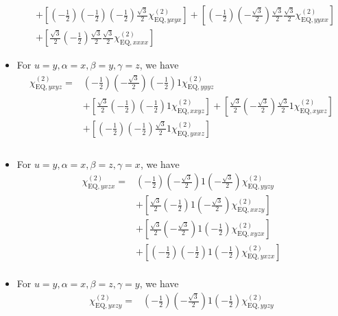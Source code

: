 \documentclass[UTF8,10pt,a4paper]{article}
\begin{document}
\begin{itemize}
\begin{align}
\nonumber&+\left[\left(-\frac{1}{2}\right)\left(-\frac{1}{2}\right)\left(-\frac{1}{2}\right)\frac{\sqrt{3}}{2}\chi_{\text{EQ},yxyx}^{(2)}\right]+\left[\left(-\frac{1}{2}\right)\left(-\frac{\sqrt{3}}{2}\right)\frac{\sqrt{3}}{2}\frac{\sqrt{3}}{2}\chi_{\text{EQ},yyxx}^{(2)}\right]\\
&+\left[\frac{\sqrt{3}}{2}\left(-\frac{1}{2}\right)\frac{\sqrt{3}}{2}\frac{\sqrt{3}}{2}\chi_{\text{EQ},xxxx}^{(2)}\right]
\end{align}\normalsize
\item For $u=y,\alpha=x,\beta=y,\gamma=z$, we have
\footnotesize\begin{align}
\nonumber\chi_{\text{EQ},yxyz}^{(2)}=&\left(-\frac{1}{2}\right)\left(-\frac{\sqrt{3}}{2}\right)\left(-\frac{1}{2}\right)1\chi_{\text{EQ},yyyz}^{(2)}\\
\nonumber&+\left[\frac{\sqrt{3}}{2}\left(-\frac{1}{2}\right)\left(-\frac{1}{2}\right)1\chi_{\text{EQ},xxyz}^{(2)}\right]+\left[\frac{\sqrt{3}}{2}\left(-\frac{\sqrt{3}}{2}\right)\frac{\sqrt{3}}{2}1\chi_{\text{EQ},xyxz}^{(2)}\right]\\
\nonumber&+\left[\left(-\frac{1}{2}\right)\left(-\frac{1}{2}\right)\frac{\sqrt{3}}{2}1\chi_{\text{EQ},yxxz}^{(2)}\right]\\
\nonumber&\\
&
\end{align}\normalsize
\item For $u=y,\alpha=x,\beta=z,\gamma=x$, we have
\footnotesize\begin{align}
\nonumber\chi_{\text{EQ},yxzx}^{(2)}=&\left(-\frac{1}{2}\right)\left(-\frac{\sqrt{3}}{2}\right)1\left(-\frac{\sqrt{3}}{2}\right)\chi_{\text{EQ},yyzy}^{(2)}\\
\nonumber&+\left[\frac{\sqrt{3}}{2}\left(-\frac{1}{2}\right)1\left(-\frac{\sqrt{3}}{2}\right)\chi_{\text{EQ},xxzy}^{(2)}\right]\\
\nonumber&+\left[\frac{\sqrt{3}}{2}\left(-\frac{\sqrt{3}}{2}\right)1\left(-\frac{1}{2}\right)\chi_{\text{EQ},xyzx}^{(2)}\right]\\
\nonumber&+\left[\left(-\frac{1}{2}\right)\left(-\frac{1}{2}\right)1\left(-\frac{1}{2}\right)\chi_{\text{EQ},yxzx}^{(2)}\right]\\
&
\end{align}\normalsize
\item For $u=y,\alpha=x,\beta=z,\gamma=y$, we have
\footnotesize\begin{align}
\nonumber\chi_{\text{EQ},yxzy}^{(2)}=&\left(-\frac{1}{2}\right)\left(-\frac{\sqrt{3}}{2}\right)1\left(-\frac{1}{2}\right)\chi_{\text{EQ},yyzy}^{(2)}\\

\end{align}
\end{itemize}
\end{document}
